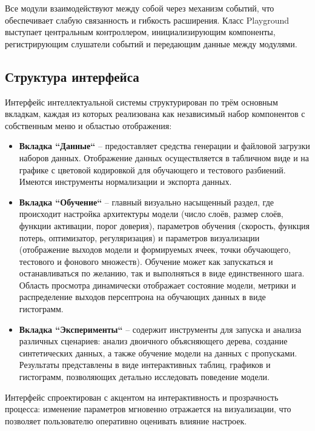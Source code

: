Все модули взаимодействуют между собой через механизм событий, что обеспечивает слабую связанность и гибкость расширения. Класс Playground выступает центральным контроллером, инициализирующим компоненты, регистрирующим слушатели событий и передающим данные между модулями.

\subsection{Структура интерфейса}

Интерфейс интеллектуальной системы структурирован по трём основным вкладкам, каждая из которых реализована как независимый набор компонентов с собственным меню и областью отображения:

\begin{itemize}
    \item \textbf{Вкладка ``Данные``} -- предоставляет средства генерации и файловой загрузки наборов данных. Отображение данных осуществляется в табличном виде и на графике с цветовой кодировкой для обучающего и тестового разбиений. Имеются инструменты нормализации и экспорта данных.

    \item \textbf{Вкладка ``Обучение``} -- главный визуально насыщенный раздел, где происходит настройка архитектуры модели (число слоёв, размер слоёв, функции активации, порог доверия), параметров обучения (скорость, функция потерь, оптимизатор, регуляризация) и параметров визуализации (отображение выходов модели и формируемых ячеек, точки обучающего, тестового и фонового множеств). Обучение может как запускаться и останавливаться по желанию, так и выполняться в виде единственного шага. Область просмотра динамически отображает состояние модели, метрики и распределение выходов персептрона на обучающих данных в виде гистограмм.

    \item \textbf{Вкладка ``Эксперименты``} -- содержит инструменты для запуска и анализа различных сценариев: анализ двоичного объясняющего дерева, создание синтетических данных, а также обучение модели на данных с пропусками. Результаты представлены в виде интерактивных таблиц, графиков и гистограмм, позволяющих детально исследовать поведение модели.
\end{itemize}

Интерфейс спроектирован с акцентом на интерактивность и прозрачность процесса: изменение параметров мгновенно отражается на визуализации, что позволяет пользователю оперативно оценивать влияние настроек.

